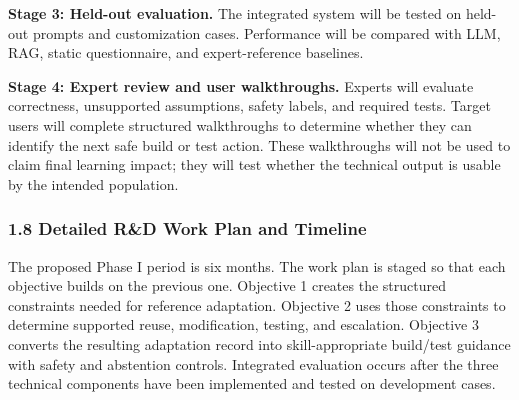 \textbf{Stage 3: Held-out evaluation.} The integrated system will be tested on held-out prompts and customization cases. Performance will be compared with LLM, RAG, static questionnaire, and expert-reference baselines.

\textbf{Stage 4: Expert review and user walkthroughs.} Experts will evaluate correctness, unsupported assumptions, safety labels, and required tests. Target users will complete structured walkthroughs to determine whether they can identify the next safe build or test action. These walkthroughs will not be used to claim final learning impact; they will test whether the technical output is usable by the intended population.



\subsubsection*{1.8 Detailed R\&D Work Plan and Timeline}








The proposed Phase I period is six months. The work plan is staged so that each objective builds on the previous one. Objective 1 creates the structured constraints needed for reference adaptation. Objective 2 uses those constraints to determine supported reuse, modification, testing, and escalation. Objective 3 converts the resulting adaptation record into skill-appropriate build/test guidance with safety and abstention controls. Integrated evaluation occurs after the three technical components have been implemented and tested on development cases.

